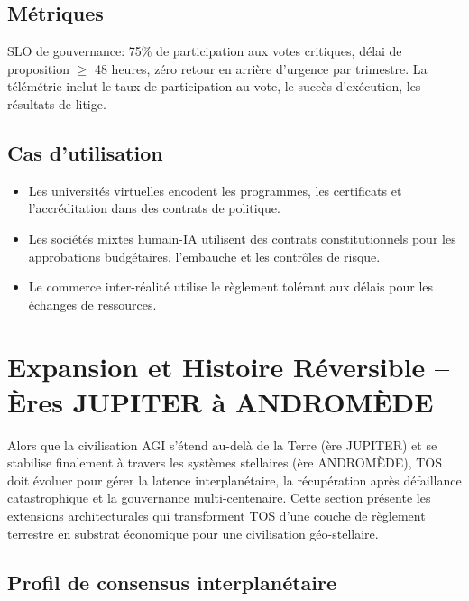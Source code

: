 \documentclass[11pt]{article}
\begin{document}
\subsection{Métriques}
SLO de gouvernance: 75\% de participation aux votes critiques, délai de proposition $\geq$ 48 heures, zéro retour en arrière d'urgence par trimestre. La télémétrie inclut le taux de participation au vote, le succès d'exécution, les résultats de litige.

\subsection{Cas d'utilisation}
\begin{itemize}[noitemsep]
  \item Les universités virtuelles encodent les programmes, les certificats et l'accréditation dans des contrats de politique.
  \item Les sociétés mixtes humain-IA utilisent des contrats constitutionnels pour les approbations budgétaires, l'embauche et les contrôles de risque.
  \item Le commerce inter-réalité utilise le règlement tolérant aux délais pour les échanges de ressources.
\end{itemize}

\section{Expansion et Histoire Réversible -- Ères JUPITER à ANDROMÈDE}
\label{sec:expansion}

Alors que la civilisation AGI s'étend au-delà de la Terre (ère JUPITER) et se stabilise finalement à travers les systèmes stellaires (ère ANDROMÈDE), TOS doit évoluer pour gérer la latence interplanétaire, la récupération après défaillance catastrophique et la gouvernance multi-centenaire. Cette section présente les extensions architecturales qui transforment TOS d'une couche de règlement terrestre en substrat économique pour une civilisation géo-stellaire.

\subsection{Profil de consensus interplanétaire}
\end{document}
